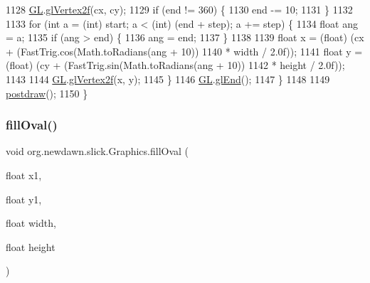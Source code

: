 \begin{DoxyCode}
1128             \mbox{\hyperlink{classorg_1_1newdawn_1_1slick_1_1_graphics_a39ca68db81b225982a4421c4a6835eed}{GL}}.\mbox{\hyperlink{interfaceorg_1_1newdawn_1_1slick_1_1opengl_1_1renderer_1_1_s_g_l_ad9c89f8bb275f22956f7687da5ec27c5}{glVertex2f}}(cx, cy);
1129             \textcolor{keywordflow}{if} (end != 360) \{
1130                 end -= 10;
1131             \}
1132 
1133             \textcolor{keywordflow}{for} (\textcolor{keywordtype}{int} a = (\textcolor{keywordtype}{int}) start; a < (int) (end + step); a += step) \{
1134                 \textcolor{keywordtype}{float} ang = a;
1135                 \textcolor{keywordflow}{if} (ang > end) \{
1136                     ang = end;
1137                 \}
1138 
1139                 \textcolor{keywordtype}{float} x = (float) (cx + (FastTrig.cos(Math.toRadians(ang + 10))
1140                         * width / 2.0f));
1141                 \textcolor{keywordtype}{float} y = (float) (cy + (FastTrig.sin(Math.toRadians(ang + 10))
1142                         * height / 2.0f));
1143 
1144                 \mbox{\hyperlink{classorg_1_1newdawn_1_1slick_1_1_graphics_a39ca68db81b225982a4421c4a6835eed}{GL}}.\mbox{\hyperlink{interfaceorg_1_1newdawn_1_1slick_1_1opengl_1_1renderer_1_1_s_g_l_ad9c89f8bb275f22956f7687da5ec27c5}{glVertex2f}}(x, y);
1145             \}
1146             \mbox{\hyperlink{classorg_1_1newdawn_1_1slick_1_1_graphics_a39ca68db81b225982a4421c4a6835eed}{GL}}.\mbox{\hyperlink{interfaceorg_1_1newdawn_1_1slick_1_1opengl_1_1renderer_1_1_s_g_l_a7f5666aaa59b12617ab81e1263140f72}{glEnd}}();
1147         \}
1148 
1149         \mbox{\hyperlink{classorg_1_1newdawn_1_1slick_1_1_graphics_abe054371d1486618ff327bbbcf02ff97}{postdraw}}();
1150     \}
\end{DoxyCode}
\mbox{\label{classorg_1_1newdawn_1_1slick_1_1_graphics_acdbb1302b137c651486bbdcbcd65d45a}} 
\subsubsection{\texorpdfstring{fill\+Oval()}{fillOval()}\hspace{0.1cm}{\footnotesize\ttfamily [1/2]}}
{\footnotesize\ttfamily void org.\+newdawn.\+slick.\+Graphics.\+fill\+Oval (\begin{DoxyParamCaption}\item[{float}]{x1,  }\item[{float}]{y1,  }\item[{float}]{width,  }\item[{float}]{height }\end{DoxyParamCaption})\hspace{0.3cm}{\ttfamily [inline]}}

